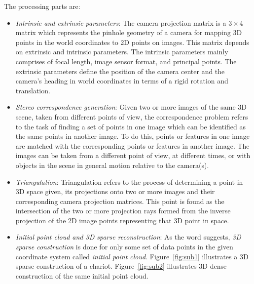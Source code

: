 \documentclass{article}
\begin{document}
		The processing parts are:
			\begin{itemize}
			\item \textit{Intrinsic and extrinsic parameters}: The camera projection matrix is a $3 \times 4$ matrix which represents the pinhole geometry of a camera for mapping 3D points in the world coordinates to 2D points on images. This matrix depends on extrinsic and intrinsic parameters. The intrinsic parameters mainly comprises of focal length, image sensor format, and principal points. The extrinsic parameters define the position of the camera center and the camera's heading in world coordinates in terms of a rigid rotation and translation. 
			\item \textit{Stereo correspondence generation}: Given two or more images of the same 3D scene, taken from different points of view, the correspondence problem refers to the task of finding a set of points in one image which can be identified as the same points in another image. To do this, points or features in one image are matched with the corresponding points or features in another image. The images can be taken from a different point of view, at different times, or with objects in the scene in general motion relative to the camera(s).
			\item \textit{Triangulation}: Triangulation refers to the process of determining a point in 3D space given, its projections onto two or more images and their corresponding camera projection matrices. This point is found as the intersection of the two or more projection rays formed from the inverse projection of the 2D image points representing that 3D point in space.
			\item \textit{Initial point cloud and 3D sparse reconstruction}: As the word suggests, \textit{3D sparse construction} is done for only some set of data points in the given coordinate system called \textit{initial point cloud}. Figure~\ref{fig:sub1} illustrates a 3D sparse construction of a chariot. Figure~\ref{fig:sub2} illustrates 3D dense construction of the same initial point cloud.

			\end{itemize}
\end{document}
